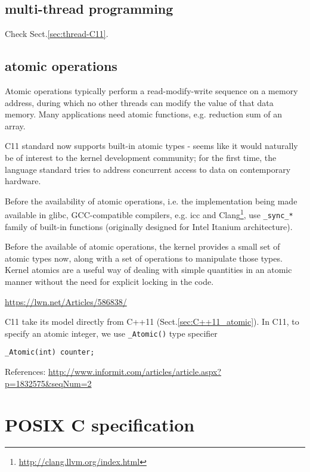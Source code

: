 \subsection{multi-thread programming}
\label{sec:C11_threads}

Check Sect.\ref{sec:thread-C11}.

\subsection{atomic operations}
\label{sec:C11_atomic_op}

Atomic operations typically perform a read-modify-write sequence on a memory
address, during which no other threads can modify the value of that data memory.
Many applications need atomic functions, e.g. reduction sum of an array. 

C11 standard now supports built-in atomic types - seems like it would naturally
be of interest to the kernel development community; for the first time, the
language standard tries to address concurrent access to data on contemporary
hardware.

Before the availability of atomic operations, i.e. the implementation being made
available in glibc, GCC-compatible compilers, e.g.
icc and Clang\footnote{\url{http://clang.llvm.org/index.html}}, use
\verb!_sync_*! family of built-in functions (originally designed for Intel
Itanium architecture).

\begin{mdframed}

Before the available of atomic operations, the kernel provides a small set of
atomic types now, along with a set of operations to manipulate those types.
Kernel atomics are a useful way of dealing with simple quantities in an atomic
manner without the need for explicit locking in the code.

\url{https://lwn.net/Articles/586838/}
\end{mdframed}

C11 take its model directly from C++11 (Sect.\ref{sec:C++11_atomic}).
In C11, to specify an atomic integer, we use \verb!_Atomic()! type specifier 
\begin{lstlisting}
_Atomic(int) counter;
\end{lstlisting}


References:
\url{http://www.informit.com/articles/article.aspx?p=1832575&seqNum=2}

\section{POSIX C specification}
\label{sec:POSIX-C-specification}

